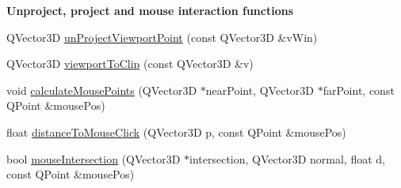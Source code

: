 \begin{Indent}\textbf{ Unproject, project and mouse interaction functions}\par
\begin{DoxyCompactItemize}
\item 
Q\+Vector3D \mbox{\hyperlink{class_g_l_e_s_renderer_a8be3d2a634d0fe1e13fb7b97673eefab}{un\+Project\+Viewport\+Point}} (const Q\+Vector3D \&v\+Win)
\item 
Q\+Vector3D \mbox{\hyperlink{class_g_l_e_s_renderer_a36440b34ef23691928cb033a55c9c6f9}{viewport\+To\+Clip}} (const Q\+Vector3D \&v)
\item 
void \mbox{\hyperlink{class_g_l_e_s_renderer_ae600d289f94594374cdbd8c031cb0c86}{calculate\+Mouse\+Points}} (Q\+Vector3D $\ast$near\+Point, Q\+Vector3D $\ast$far\+Point, const Q\+Point \&mouse\+Pos)
\item 
float \mbox{\hyperlink{class_g_l_e_s_renderer_a6f31b6893897549f3762a88a8bf135f8}{distance\+To\+Mouse\+Click}} (Q\+Vector3D p, const Q\+Point \&mouse\+Pos)
\item 
bool \mbox{\hyperlink{class_g_l_e_s_renderer_a2c8f6b6ff0df6acafc6cbd7a82678a17}{mouse\+Intersection}} (Q\+Vector3D $\ast$intersection, Q\+Vector3D normal, float d, const Q\+Point \&mouse\+Pos)
\end{DoxyCompactItemize}
\end{Indent}
\textbf{ }\par
